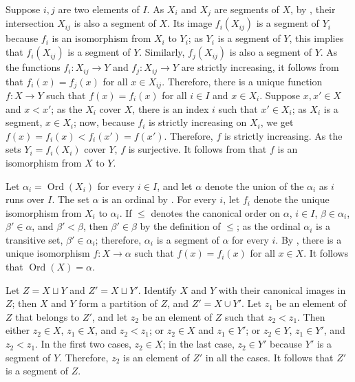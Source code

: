 \documentclass{article}
\begin{document}
\begin{solution}[\ref{exe:mybmksm1}]
  \label{sol:yxq37p1c}
  Suppose \(i,j\) are two elements of \(I\).  As \(X_i\) and \(X_j\)
  are segments of \(X\), by , their intersection
  \(X_{ij}\) is also a segment of \(X\).  Its image \(f_i(X_{ij})\) is
  a segment of \(Y_i\) because \(f_i\) is an isomorphism from \(X_i\)
  to \(Y_i\); as \(Y_i\) is a segment of \(Y\), this implies that
  \(f_i(X_{ij})\) is a segment of \(Y\).  Similarly, \(f_j(X_{ij})\)
  is also a segment of \(Y\).  As the functions \(f_i : X_{ij} \to Y\)
  and \(f_j : X_{ij} \to Y\) are strictly increasing, it follows from
   that \(f_i(x) = f_j(x)\) for all
  \(x \in X_{ij}\).  Therefore, there is a unique function
  \(f : X \to Y\) such that \(f(x) = f_i(x)\) for all \(i \in I\) and
  \(x \in X_i\).  Suppose \(x, x' \in X\) and \(x < x'\); as the
  \(X_i\) cover \(X\), there is an index \(i\) such that
  \(x' \in X_i\); as \(X_i\) is a segment, \(x \in X_i\); now, because
  \(f_i\) is strictly increasing on \(X_i\), we get
  \(f(x) = f_i(x) < f_i(x') = f(x')\).  Therefore, \(f\) is strictly
  increasing.  As the sets \(Y_i = f_i(X_i)\) cover \(Y\), \(f\) is
  surjective.  It follows from  that \(f\) is an
  isomorphism from \(X\) to \(Y\).
\end{solution}

\begin{solution}[\ref{exe:e0x1yv2c}]
  \label{sol:2a9apl7w}
  Let \(\alpha_i = \operatorname{Ord}(X_i)\) for every \(i \in I\),
  and let \(\alpha\) denote the union of the \(\alpha_i\) as \(i\)
  runs over \(I\).  The set \(\alpha\) is an ordinal by
  .  For every \(i\), let \(f_i\) denote the unique
  isomorphism from \(X_i\) to \(\alpha_i\).  If \(\leq\) denotes the
  canonical order on \(\alpha\), \(i \in I\), \(\beta \in \alpha_i\),
  \(\beta' \in \alpha\), and \(\beta' < \beta\), then
  \(\beta' \in \beta\) by the definition of \(\leq\); as the ordinal
  \(\alpha_i\) is a transitive set, \(\beta' \in \alpha_i\);
  therefore, \(\alpha_i\) is a segment of \(\alpha\) for every \(i\).
  By , there is a unique isomorphism
  \(f : X \to \alpha\) such that \(f(x) = f_i(x)\) for all
  \(x \in X\).  It follows that \(\operatorname{Ord}(X) = \alpha\).
\end{solution}

\begin{solution}[\ref{exe:5b354opw}]
  \label{sol:suyilrlv}
  Let \(Z = X \sqcup Y\) and \(Z' = X \sqcup Y'\).  Identify \(X\) and
  \(Y\) with their canonical images in \(Z\); then \(X\) and \(Y\)
  form a partition of \(Z\), and \(Z' = X \cup Y'\).  Let \(z_1\) be
  an element of \(Z\) that belongs to \(Z'\), and let \(z_2\) be an
  element of \(Z\) such that \(z_2 < z_1\).  Then either
  \(z_2 \in X\), \(z_1 \in X\), and \(z_2 < z_1\); or \(z_2 \in X\)
  and \(z_1 \in Y'\); or \(z_2 \in Y\), \(z_1 \in Y'\), and
  \(z_2 < z_1\).  In the first two cases, \(z_2 \in X\); in the last
  case, \(z_2 \in Y'\) because \(Y'\) is a segment of \(Y\).
  Therefore, \(z_2\) is an element of \(Z'\) in all the cases.  It
  follows that \(Z'\) is a segment of \(Z\).
\end{solution}
\end{document}
